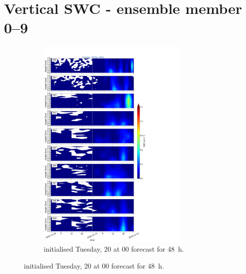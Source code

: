 
\section{Vertical SWC - ensemble member \numrange{0}{9}}%
\label{app:vert_ensmemb09}

\begin{figure}[h]
	\centering
	\begin{subfigure}[b]{\textwidth}
		\centering
		\includegraphics[trim={0cm 0cm 18.3cm 5.1cm},clip,width=0.8\textwidth]{./fig_09EM/20161220}
		\caption{initialised Tuesday, \SI{20}{\dec} at 0\SI{0}{\UTC} forecast for \SI{48}{\hour}.}\label{fig:EM09_20}
	\end{subfigure}
	
\end{figure}
